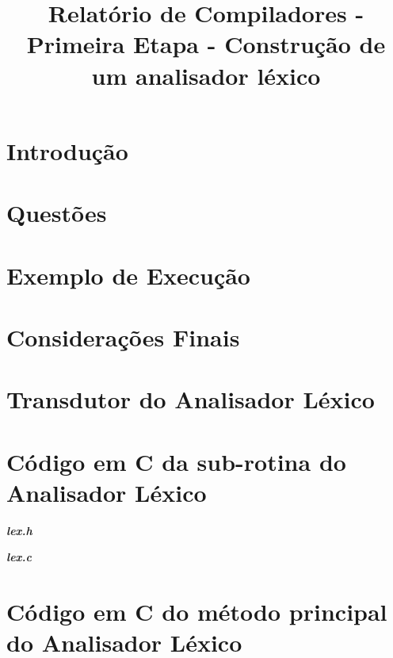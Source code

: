 \documentclass[12pt,oneside,a4paper,english]{abntex2}
\title{Relatório de Compiladores - Primeira Etapa - Construção de um analisador léxico}
\begin{document}
\frenchspacing %

\imprimircapa
\imprimirfolhaderosto

\clearpage
\begin{resumo}
	
\end{resumo}

\tableofcontents

\textual

\chapter{Introdução}
\label{chap:introducao}
	

\chapter{Questões}
\label{chap:questoes}
	

\chapter{Exemplo de Execução}
\label{chap:execucao}
	

\chapter{Considerações Finais}
\label{chap:conclusao}
	



\begin{apendicesenv} %

\partapendices

\chapter{Transdutor do Analisador Léxico}
\label{app:transdutor}


\chapter{Código em C da sub-rotina do Analisador Léxico}
\label{app:codigo-lexico}
\textbf{\emph{lex.h}}

\textbf{\emph{lex.c}}


\chapter{Código em C do método principal do Analisador Léxico}
\label{app:codigo-principal}


\end{apendicesenv}
\end{document}

